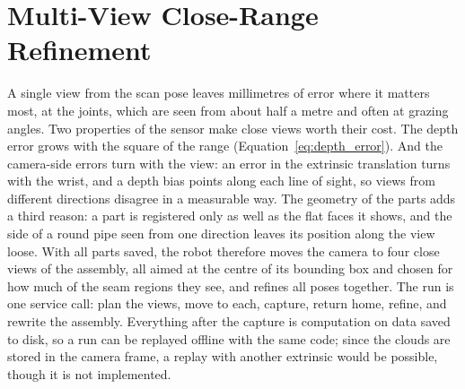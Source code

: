 \section{Multi-View Close-Range Refinement}
\label{sec:mc_multiview}
A single view from the scan pose leaves millimetres of error where it matters most, at the joints,
which are seen from about half a metre and often at grazing angles. Two properties of the sensor
make close views worth their cost. The depth error grows with the square of the range
(Equation~\ref{eq:depth_error}). And the camera-side errors turn with the view: an error in the
extrinsic translation turns with the wrist, and a depth bias points along each line of sight, so
views from different directions disagree in a measurable way. The geometry of the parts adds a
third reason: a part is registered only as well as the flat faces it shows, and the side of a round
pipe seen from one direction leaves its position along the view loose. With all parts saved, the
robot therefore moves the camera to four close views of the assembly, all aimed at the centre of its
bounding box and chosen for how much of the seam regions they see, and refines all poses together.
The run is one service call: plan the views, move to each, capture, return home, refine, and rewrite
the assembly. Everything after the capture is computation on data saved to disk, so a run can be
replayed offline with the same code; since the clouds are stored in the camera frame, a replay with
another extrinsic would be possible, though it is not implemented.

